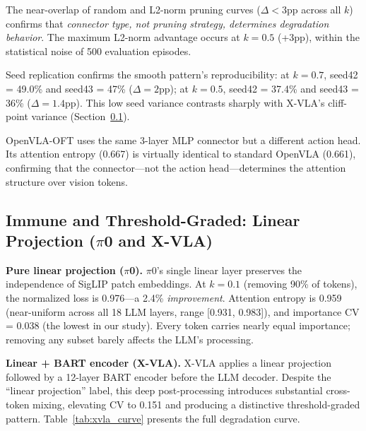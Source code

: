 \documentclass[letterpaper]{article}
\begin{document}
The near-overlap of random and L2-norm pruning curves ($\Delta < 3$pp across all $k$) confirms that \emph{connector type, not pruning strategy, determines degradation behavior}. The maximum L2-norm advantage occurs at $k{=}0.5$ (+3pp), within the statistical noise of 500 evaluation episodes.

Seed replication confirms the smooth pattern's reproducibility: at $k{=}0.7$, seed42 = 49.0\% and seed43 = 47\% ($\Delta = 2$pp); at $k{=}0.5$, seed42 = 37.4\% and seed43 = 36\% ($\Delta = 1.4$pp). This low seed variance contrasts sharply with X-VLA's cliff-point variance (Section~\ref{sec:xvla}).

OpenVLA-OFT uses the same 3-layer MLP connector but a different action head. Its attention entropy (0.667) is virtually identical to standard OpenVLA (0.661), confirming that the connector---not the action head---determines the attention structure over vision tokens.

\subsection{Immune and Threshold-Graded: Linear Projection ($\pi$0 and X-VLA)}
\label{sec:xvla}

\textbf{Pure linear projection ($\pi$0).} $\pi$0's single linear layer preserves the independence of SigLIP patch embeddings. At $k{=}0.1$ (removing 90\% of tokens), the normalized loss is 0.976---a 2.4\% \emph{improvement}. Attention entropy is 0.959 (near-uniform across all 18 LLM layers, range [0.931, 0.983]), and importance CV = 0.038 (the lowest in our study). Every token carries nearly equal importance; removing any subset barely affects the LLM's processing.

\textbf{Linear + BART encoder (X-VLA).} X-VLA applies a linear projection followed by a 12-layer BART encoder before the LLM decoder. Despite the ``linear projection'' label, this deep post-processing introduces substantial cross-token mixing, elevating CV to 0.151 and producing a distinctive threshold-graded pattern. Table~\ref{tab:xvla_curve} presents the full degradation curve.
\end{document}
